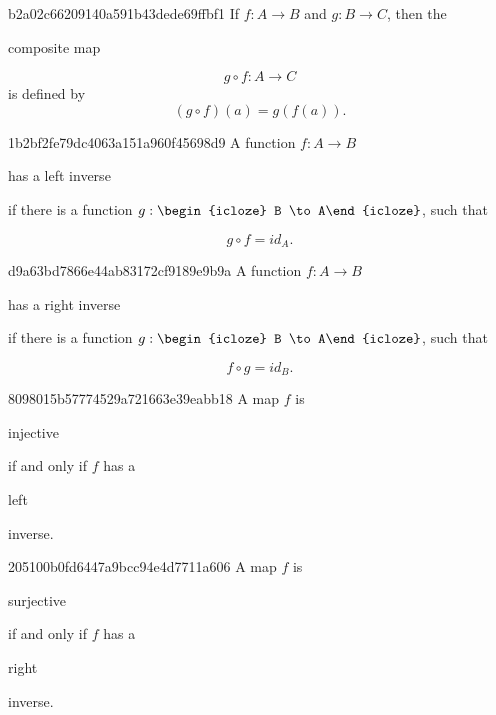 \begin{note}{b2a02c66209140a591b43dede69ffbf1}
    If \({ f : A \to B }\) and \({ g : B \to C }\), then the \begin{icloze}{1}composite map\end{icloze}
    \[
        g \circ f : A \to C
    \]
    is defined by
    \[
        (g \circ f)(a) = g(f(a)).
    \]
\end{note}

\begin{note}{1b2bf2fe79dc4063a151a960f45698d9}
    A function \({ f : A \to B }\) \begin{icloze}{3}has a left inverse\end{icloze} if there is a function \({ g : \begin{icloze}{2}B \to A\end{icloze} }\), such that
    \begin{icloze}{1}
        \[
            g \circ f = id_A.
        \]
    \end{icloze}
\end{note}

\begin{note}{d9a63bd7866e44ab83172cf9189e9b9a}
    A function \({ f : A \to B }\) \begin{icloze}{3}has a right inverse\end{icloze} if there is a function \({ g : \begin{icloze}{2}B \to A\end{icloze} }\), such that
    \begin{icloze}{1}
        \[
            f \circ g = id_B.
        \]
    \end{icloze}
\end{note}

\begin{note}{8098015b57774529a721663e39eabb18}
    A map \({ f }\) is \begin{icloze}{1}injective\end{icloze} if and only if \({ f }\) has a \begin{icloze}{2}left\end{icloze} inverse.
\end{note}

\begin{note}{205100b0fd6447a9bcc94e4d7711a606}
    A map \({ f }\) is \begin{icloze}{1}surjective\end{icloze} if and only if \({ f }\) has a \begin{icloze}{2}right\end{icloze} inverse.
\end{note}

